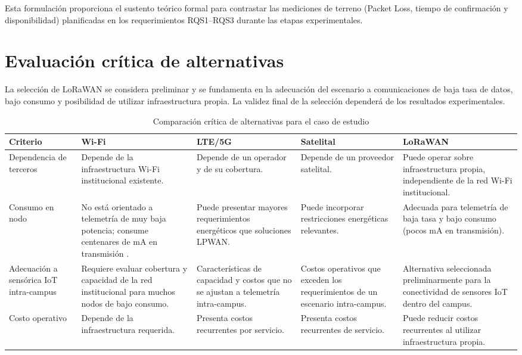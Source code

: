 \documentclass[12pt,oneside,openany,spanish,oldfontcommands]{memoir}
\begin{document}
Esta formulación proporciona el sustento teórico formal para contrastar las mediciones de
terreno (Packet Loss, tiempo de confirmación y disponibilidad) planificadas en los
requerimientos RQS1--RQS3 durante las etapas experimentales.

\section{Evaluación crítica de alternativas}

La selección de LoRaWAN se considera preliminar y se fundamenta en la adecuación del
escenario a comunicaciones de baja tasa de datos, bajo consumo y posibilidad de utilizar
infraestructura propia. La validez final de la selección dependerá de los resultados
experimentales.

\begin{table}[H]
\centering
\caption{Comparación crítica de alternativas para el caso de estudio}
\label{tab:alternativas}
\tiny
\begin{tabularx}{\textwidth}{
  >{\raggedright\arraybackslash}p{2.5cm}
  >{\raggedright\arraybackslash}X
  >{\raggedright\arraybackslash}X
  >{\raggedright\arraybackslash}X
  >{\raggedright\arraybackslash}X}
\toprule
\textbf{Criterio} &
\textbf{Wi-Fi} &
\textbf{LTE/5G} &
\textbf{Satelital} &
\textbf{LoRaWAN}\\
\midrule
Dependencia de terceros &
Depende de la infraestructura Wi-Fi institucional existente.
&
Depende de un operador y de su cobertura.
&
Depende de un proveedor satelital.
&
Puede operar sobre infraestructura propia, independiente de la red Wi-Fi institucional.
\\
\midrule
Consumo en nodo &
No está orientado a telemetría de muy baja potencia; consume centenares de mA en transmisión \parencite{callebaut2020}.
&
Puede presentar mayores requerimientos energéticos que soluciones LPWAN.
&
Puede incorporar restricciones energéticas relevantes.
&
Adecuada para telemetría de baja tasa y bajo consumo (pocos mA en transmisión).
\\
\midrule
Adecuación a sensórica IoT intra-campus &
Requiere evaluar cobertura y capacidad de la red institucional para muchos nodos de bajo consumo.
&
Características de capacidad y costos que no se ajustan a telemetría intra-campus.
&
Costos operativos que exceden los requerimientos de un escenario intra-campus.
&
Alternativa seleccionada preliminarmente para la conectividad de sensores IoT dentro del campus.
\\
\midrule
Costo operativo &
Depende de la infraestructura requerida.
&
Presenta costos recurrentes por servicio.
&
Presenta costos recurrentes de servicio.
&
Puede reducir costos recurrentes al utilizar infraestructura propia.
\\
\bottomrule
\end{tabularx}
\end{table}
\end{document}
